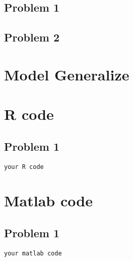 \documentclass[a4paper,12pt]{article}
\begin{document}
\begin{CJK*}{GBK}{song}
\subsection{Problem 1}

\subsection{Problem 2}


\section{Model Generalize}

\renewcommand\refname{References}



\newpage
{}
\section{R code}
\subsection{Problem 1}
\begin{verbatim} 
your R code
\end{verbatim}

\section{Matlab code}
\subsection{Problem 1}
\begin{verbatim}
your matlab code
\end{verbatim}

\end{CJK*}
\end{document}
